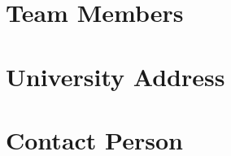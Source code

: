 \documentclass[12pt]{article}
\begin{document}
\section{Team Members}

\section{University Address}

\section{Contact Person}



\end{document}
